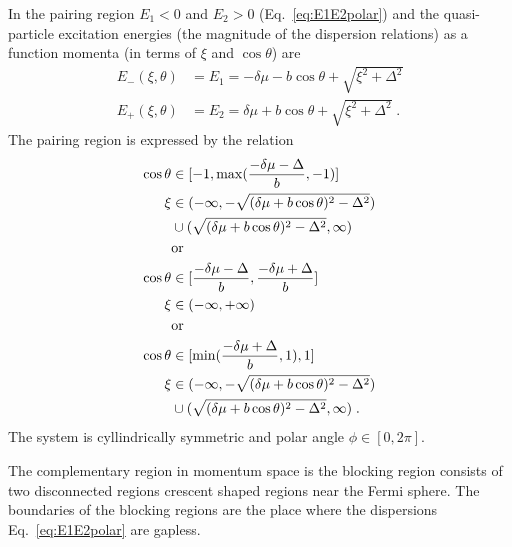 \documentclass[10pt, aps, prd, superscriptaddress, nofootinbib, 
               amsmath, amssymb, twocolumn,
               preprintnumbers, showpacs,
               raggedbottom,
               floatfix]{revtex4-1}
\begin{document}
In the pairing region $E_1<0$ and $E_2>0$ (Eq.~\ref{eq:E1E2polar}) and the
quasi-particle excitation energies (the magnitude of the dispersion relations)
as a function momenta (in terms of $\xi$ and $\cos\theta$) are
\begin{equation}
\begin{split}
E_-(\xi, \theta) &= E_1 = -\delta\mu - b\cos\theta +
\sqrt{\xi^2+\Delta^2}\\
E_+(\xi, \theta) &= E_2 = \delta\mu + b\cos\theta + \sqrt{\xi^2+\Delta^2}\;.
~\label{eq:excitation_pairing_region}
\end{split}
\end{equation}
The pairing region is expressed by the relation
\begin{equation}
\begin{split}
\cos\theta &\in [-1, {\rm{max}}(\frac{-\delta\mu-\Delta}{b},-1)] \\
\xi &\in(-\infty,-\sqrt{(\delta\mu+b\cos\theta)^2-\Delta^2})\\
&
\cup(\sqrt{(\delta\mu+b\cos\theta)^2-\Delta^2},\infty)\\
&{\rm{or}}\\
\cos\theta &\in [\frac{-\delta\mu-\Delta}{b},
\frac{-\delta\mu+\Delta}{b}] \\
\xi &\in (-\infty, +\infty)\\
&{\rm{or}}\\
\cos\theta &\in [{\rm{min}}(\frac{-\delta\mu+\Delta}{b},1), 1]\ \\
\xi &\in(-\infty,-\sqrt{(\delta\mu+b\cos\theta)^2-\Delta^2})\\
&
\cup(\sqrt{(\delta\mu+b\cos\theta)^2-\Delta^2},\infty)
\;.
\end{split}
\end{equation}
The system is cyllindrically symmetric and polar angle $\phi\in[0,2\pi]$.

The complementary region in momentum space is the blocking region consists of
two disconnected regions crescent shaped regions near the Fermi sphere.  The boundaries 
of the blocking regions are the place where the dispersions
Eq.~\ref{eq:E1E2polar} are gapless.
\end{document}
